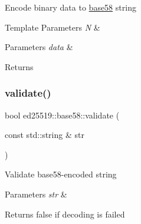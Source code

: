 Encode binary data to \mbox{\hyperlink{namespaceed25519_1_1base58}{base58}} string 
\begin{DoxyTemplParams}{Template Parameters}
{\em N} & \\
\hline
\end{DoxyTemplParams}

\begin{DoxyParams}{Parameters}
{\em data} & \\
\hline
\end{DoxyParams}
\begin{DoxyReturn}{Returns}

\end{DoxyReturn}
\mbox{\label{namespaceed25519_1_1base58_a2b3ccbfdccfbcc3125de0070e5b37e67}} 
\subsubsection{\texorpdfstring{validate()}{validate()}}
{\footnotesize\ttfamily bool ed25519\+::base58\+::validate (\begin{DoxyParamCaption}\item[{const std\+::string \&}]{str }\end{DoxyParamCaption})}

Validate base58-\/encoded string 
\begin{DoxyParams}{Parameters}
{\em str} & \\
\hline
\end{DoxyParams}
\begin{DoxyReturn}{Returns}
false if decoding is failed 
\end{DoxyReturn}
